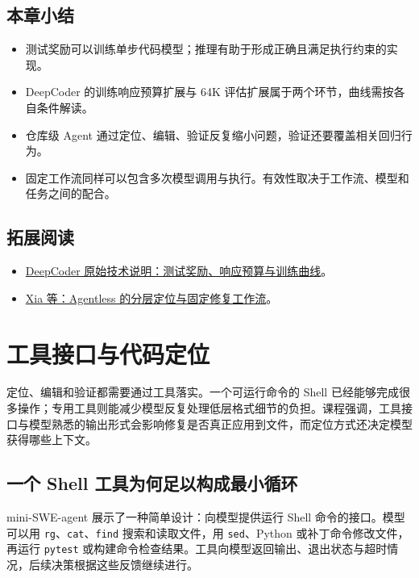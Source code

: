 \documentclass[11pt,a4paper]{article}
\begin{document}
\subsection{本章小结}
\begin{itemize}\setlength{\itemsep}{2pt}\setlength{\parsep}{0pt}\setlength{\topsep}{4pt}
\item 测试奖励可以训练单步代码模型；推理有助于形成正确且满足执行约束的实现。
\item DeepCoder 的训练响应预算扩展与 64K 评估扩展属于两个环节，曲线需按各自条件解读。
\item 仓库级 Agent 通过定位、编辑、验证反复缩小问题，验证还要覆盖相关回归行为。
\item 固定工作流同样可以包含多次模型调用与执行。有效性取决于工作流、模型和任务之间的配合。
\end{itemize}

\subsection{拓展阅读}
\begin{itemize}\setlength{\itemsep}{2pt}\setlength{\parsep}{0pt}\setlength{\topsep}{4pt}
\item \href{https://www.together.ai/blog/deepcoder}{DeepCoder 原始技术说明：测试奖励、响应预算与训练曲线}。
\item \href{https://arxiv.org/abs/2407.01489}{Xia 等：Agentless 的分层定位与固定修复工作流}。
\end{itemize}

\endgroup
\clearpage
\section{工具接口与代码定位}

定位、编辑和验证都需要通过工具落实。一个可运行命令的 Shell 已经能够完成很多操作；专用工具则能减少模型反复处理低层格式细节的负担。课程强调，工具接口与模型熟悉的输出形式会影响修复是否真正应用到文件，而定位方式还决定模型获得哪些上下文。

\subsection{一个 Shell 工具为何足以构成最小循环}

mini-SWE-agent 展示了一种简单设计：向模型提供运行 Shell 命令的接口。模型可以用 \texttt{rg}、\texttt{cat}、\texttt{find} 搜索和读取文件，用 \texttt{sed}、Python 或补丁命令修改文件，再运行 \texttt{pytest} 或构建命令检查结果。工具向模型返回输出、退出状态与超时情况，后续决策根据这些反馈继续进行。
\end{document}
